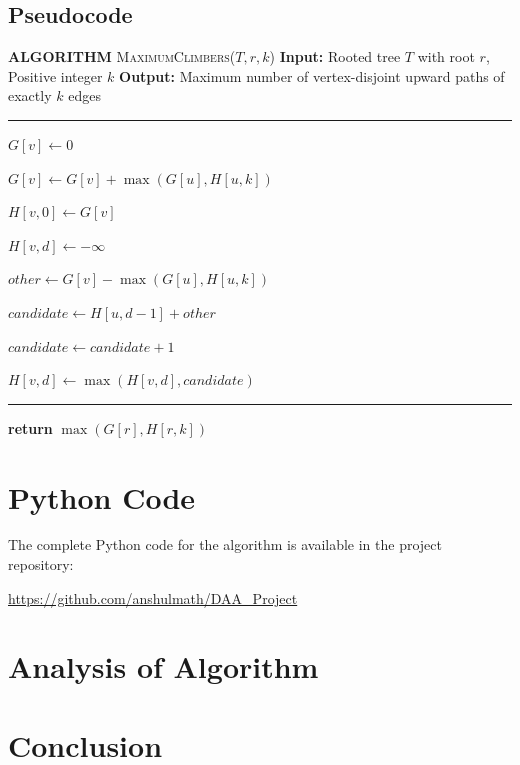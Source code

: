 \documentclass[11pt]{scrartcl}
\theoremstyle{plain}
\theoremstyle{definition}
\theoremstyle{remark}
\begin{document}
\subsection{Pseudocode}
\begin{algorithm}[t]
\caption{\textbf{Maximum Climbers Calculation}}\label{alg:max_climbers}
\begin{algorithmic}
    \Statex \textbf{ALGORITHM} \textsc{MaximumClimbers}($T, r, k$)
    \Statex \textbf{Input:} Rooted tree $T$ with root $r$, Positive integer $k$
    \Statex \textbf{Output:} Maximum number of vertex-disjoint upward paths of exactly $k$ edges
    \Statex \rule{\linewidth}{0.5pt} %
    
        \State $G[v] \gets 0$
        
            \State $G[v] \gets G[v] + \max(G[u], H[u, k])$
        \EndFor
        
        \State $H[v, 0] \gets G[v]$
        
            \State $H[v, d] \gets -\infty$
            
                \State $\mathit{other} \gets G[v] - \max(G[u], H[u, k])$
                
                    \State $\mathit{candidate} \gets H[u, d-1] + \mathit{other}$
                    
                        \State $\mathit{candidate} \gets \mathit{candidate} + 1$
                    \EndIf
                    
                    \State $H[v, d] \gets \max(H[v, d], \mathit{candidate})$
                \EndIf
            \EndFor
        \EndFor
    \EndFor
    
    \Statex \rule{\linewidth}{0.3pt} %
    \State \textbf{return} $\max(G[r], H[r, k])$
\end{algorithmic}
\end{algorithm}

\section{Python Code}
The complete Python code for the algorithm is available in the project repository:
\begin{center}
    \url{https://github.com/anshulmath/DAA_Project}
\end{center} 


\section{Analysis of Algorithm}

\section{Conclusion}
\end{document}
